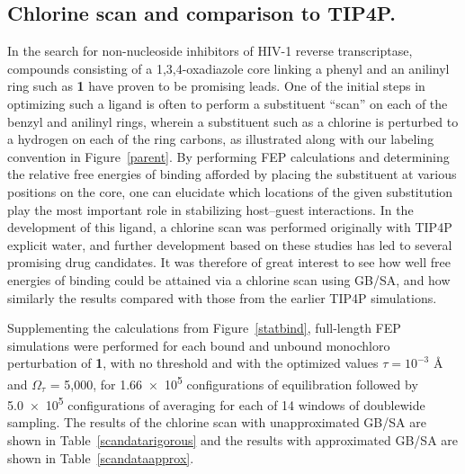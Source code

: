 \documentclass[12pt]{report}
\def\tablab{Table}\def\tabslab{\tablab s}
\def\figlab{Figure}\def\figslab{\figlab s}
\newcommand*\tbl[1]{\tablab~\ref{#1}}
\newcommand*\fig[1]{\figlab~\ref{#1}}
\begin{document}
\subsection{Chlorine scan and comparison to TIP4P.}

In the search for non-nucleoside inhibitors of HIV-1 reverse transcriptase, compounds consisting of a 1,3,4-oxadiazole core linking a phenyl and an anilinyl ring such as \textbf{1} have proven to be promising leads. One of the initial steps in optimizing such a ligand is often to perform a substituent ``scan'' on each of the benzyl and anilinyl rings, wherein a substituent such as a chlorine is perturbed to a hydrogen on each of the ring carbons, as illustrated along with our labeling convention in \fig{parent}. By performing FEP calculations and determining the relative free energies of binding afforded by placing the substituent at various positions on the core, one can elucidate which locations of the given substitution play the most important role in stabilizing host--guest interactions. In the development of this ligand, a chlorine scan was performed originally with TIP4P explicit water, \cite{tipscan} and further development based on these studies has led to several promising drug candidates.\cite{tipopt} It was therefore of great interest to see how well free energies of binding could be attained via a chlorine scan using GB/SA, and how similarly the results compared with those from the earlier TIP4P simulations. 

Supplementing the calculations from \fig{statbind}, full-length FEP simulations were performed for each bound and unbound monochloro perturbation of \textbf{1}, with no threshold and with the optimized values $\tau = 10^{-3}$ \AA{} and $\Omega_\tau$ = 5,000, for \num{1.66e5} configurations of equilibration followed by \num{5.0e5} configurations of averaging for each of 14 windows of doublewide sampling. The results of the chlorine scan with unapproximated GB/SA are shown in \tbl{scandatarigorous} and the results with approximated GB/SA are shown in \tbl{scandataapprox}.
\end{document}
